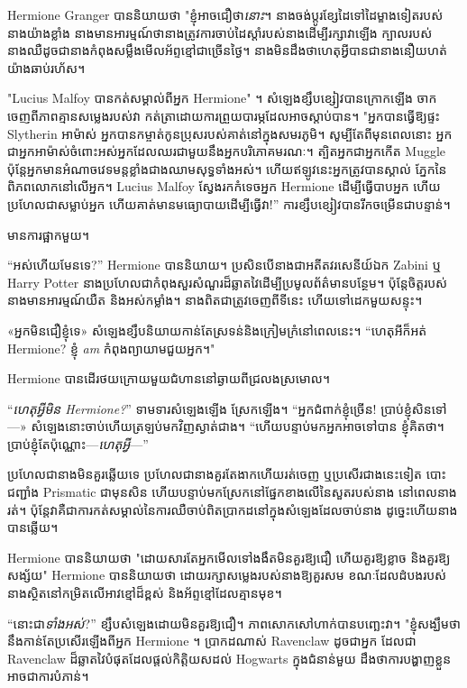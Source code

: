 {{{{{{Hermione Granger បាននិយាយថា "ខ្ញុំអាចជឿថា\emph{នោះ}។ នាងចង់ប្តូរខ្សែដៃទៅដៃម្ខាងទៀតរបស់នាងយ៉ាងខ្លាំង នាងមានអារម្មណ៍ថានាងត្រូវការចាប់ដៃស្តាំរបស់នាងដើម្បីរក្សាវាឡើង ក្បាលរបស់នាងឈឺដូចជានាងកំពុងសម្លឹងមើលអ័ព្ទខ្មៅជាច្រើនថ្ងៃ។ នាង​មិន​ដឹង​ថា​ហេតុ​អ្វី​បាន​ជា​នាង​នឿយ​ហត់​យ៉ាង​ឆាប់​រហ័ស។

"Lucius Malfoy បានកត់សម្គាល់ពីអ្នក Hermione" ។ សំឡេងខ្សឹបខ្សៀវបានក្រោកឡើង ចាកចេញពីភាពគ្មានសម្លេងរបស់វា កត់ត្រាដោយការព្រួយបារម្ភដែលអាចស្តាប់បាន។ "អ្នកបានធ្វើឱ្យផ្ទះ Slytherin អាម៉ាស់ អ្នកបានកម្ចាត់កូនប្រុសរបស់គាត់នៅក្នុងសមរភូមិ។ សូម្បី​តែ​ពី​មុន​ពេល​នោះ អ្នក​ជា​អ្នក​អាម៉ាស់​ចំពោះ​អស់​អ្នក​ដែល​ឈរ​ជា​មួយ​នឹង​អ្នក​បរិភោគ​មរណៈ។ ត្បិត​អ្នក​ជា​អ្នក​កើត​ Muggle ប៉ុន្តែ​អ្នក​មាន​អំណាច​វេទមន្ត​ខ្លាំង​ជាង​ឈាម​សុទ្ធ​ទាំង​អស់។ ហើយឥឡូវនេះអ្នកត្រូវបានស្គាល់ ភ្នែកនៃពិភពលោកនៅលើអ្នក។ Lucius Malfoy ស្វែងរកកំទេចអ្នក Hermione ដើម្បីធ្វើបាបអ្នក ហើយប្រហែលជាសម្លាប់អ្នក ហើយគាត់មានមធ្យោបាយដើម្បីធ្វើវា!” ការខ្សឹបខ្សៀវបានរីកចម្រើនជាបន្ទាន់។

មានការផ្អាកមួយ។

“អស់ហើយមែនទេ?” Hermione បាននិយាយ។ ប្រសិនបើនាងជាអតីតវរសេនីយ៍ឯក Zabini ឬ Harry Potter នាងប្រហែលជាកំពុងសួរសំណួរដ៏ឆ្លាតវៃដើម្បីប្រមូលព័ត៌មានបន្ថែម។ ប៉ុន្តែចិត្តរបស់នាងមានអារម្មណ៍យឺត និងអស់កម្លាំង។ នាងពិតជាត្រូវចេញពីទីនេះ ហើយទៅដេកមួយសន្ទុះ។

«អ្នក​មិន​ជឿ​ខ្ញុំ​ទេ» សំឡេង​ខ្សឹប​និយាយ​កាន់​តែ​ស្រទន់​និង​ក្រៀមក្រំ​នៅ​ពេល​នេះ។ “ហេតុអីក៏អត់ Hermione? ខ្ញុំ \emph{am} កំពុងព្យាយាមជួយអ្នក។"

Hermione បាន​ដើរ​ថយ​ក្រោយ​មួយ​ជំហាន​នៅ​ឆ្ងាយ​ពី​ជ្រលង​ស្រមោល។

“\emph{ហេតុអ្វីមិន Hermione?}” ទាមទារសំឡេងឡើង ស្រែកឡើង។ “អ្នកជំពាក់ខ្ញុំច្រើន! ប្រាប់​ខ្ញុំ​សិន​ទៅ—» សំឡេង​នោះ​ចាប់​ហើយ​ត្រឡប់​មក​វិញ​ស្ងាត់​ជាង។ “ហើយបន្ទាប់មកអ្នកអាចទៅបាន ខ្ញុំគិតថា។ ប្រាប់ខ្ញុំតែប៉ុណ្ណោះ—\emph{ហេតុអ្វី}—”

ប្រហែលជានាងមិនគួរឆ្លើយទេ ប្រហែលជានាងគួរតែងាកហើយរត់ចេញ ឬប្រសើរជាងនេះទៀត បោះជញ្ជាំង Prismatic ជាមុនសិន ហើយបន្ទាប់មកស្រែកនៅផ្នែកខាងលើនៃសួតរបស់នាង នៅពេលនាងរត់។ ប៉ុន្តែវាគឺជាការកត់សម្គាល់នៃការឈឺចាប់ពិតប្រាកដនៅក្នុងសំឡេងដែលចាប់នាង ដូច្នេះហើយនាងបានឆ្លើយ។

Hermione បាននិយាយថា "ដោយសារតែអ្នកមើលទៅងងឹតមិនគួរឱ្យជឿ ហើយគួរឱ្យខ្លាច និងគួរឱ្យសង្ស័យ" Hermione បាននិយាយថា ដោយរក្សាសម្លេងរបស់នាងឱ្យគួរសម ខណៈដែលដំបងរបស់នាងស្ថិតនៅកម្រិតលើអាវខ្មៅដ៏ខ្ពស់ និងអ័ព្ទខ្មៅដែលគ្មានមុខ។

“នោះជា\emph{ទាំងអស់}?” ខ្សឹបសំឡេងដោយមិនគួរឱ្យជឿ។ ភាពសោកសៅ​ហាក់​បាន​បញ្ឆេះ​វា។ "ខ្ញុំសង្ឃឹមថានឹងកាន់តែប្រសើរឡើងពីអ្នក Hermione ។ ប្រាកដណាស់ Ravenclaw ដូចជាអ្នក ដែលជា Ravenclaw ដ៏ឆ្លាតវៃបំផុតដែលផ្តល់កិត្តិយសដល់ Hogwarts ក្នុងជំនាន់មួយ ដឹងថាការបង្ហាញខ្លួនអាចជាការបំភាន់។

}}}}}}
